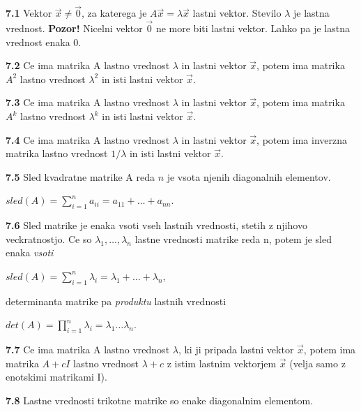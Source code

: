 \documentclass{article}
\begin{document}
\begin{multicols}{3}
\textbf{7.1} Vektor $\vec{x} \neq \vec{0}$, za katerega je $A\vec{x} = \lambda \vec{x}$ lastni vektor. Stevilo
$\lambda$ je lastna vrednost.
\textbf{Pozor!} Nicelni vektor $\vec{0}$ ne more biti lastni vektor. Lahko pa je lastna vrednost enaka 0.

\textbf{7.2} Ce ima matrika A lastno vrednost $\lambda$ in lastni vektor $\vec{x}$, potem ima matrika
$A^{2}$ lastno vrednost $\lambda^{2}$ in isti lastni vektor $\vec{x}$.

\textbf{7.3} Ce ima matrika A lastno vrednost $\lambda$ in lastni vektor $\vec{x}$, potem ima
matrika $A^{k}$ lastno vrednost $\lambda^{k}$ in isti lastni vektor $\vec{x}$.

\textbf{7.4} Ce ima matrika A lastno vrednost $\lambda$ in lastni vektor $\vec{x}$, potem ima
inverzna matrika lastno vrednost $1 / \lambda$ in isti lastni vektor $\vec{x}$.

\textbf{7.5} Sled kvadratne matrike A reda $n$ je vsota njenih diagonalnih elementov.
\begin{center}
    \begin{math}
        sled(A) =
        \sum_{i=1}^{n} a_{ii} =
        a_{11} + \dots + a_{nn}
    \end{math}.
\end{center}

\textbf{7.6} Sled matrike je enaka vsoti vseh lastnih vrednosti, stetih z njihovo veckratnostjo.
Ce so $\lambda_{1}, \dots, \lambda_{n}$ lastne vrednosti matrike reda n, potem je sled enaka \textit{vsoti}
\begin{center}
    \begin{math}
        sled(A) =
        \sum_{i=1}^{n} \lambda_{i} =
        \lambda_{1} + \dots + \lambda_{n}
    \end{math},
\end{center}
determinanta matrike pa \textit{produktu} lastnih vrednosti
\begin{center}
    \begin{math}
        det(A) =
        \prod_{i=1}^{n} \lambda_{i} =
        \lambda_{1} \dots  \lambda_{n}
    \end{math}.
\end{center}

\textbf{7.7} Ce ima matrika A lastno vrednost $\lambda$, ki ji pripada lastni vektor $\vec{x}$,
potem ima matrika $A + cI$ lastno vrednost $\lambda + c$ z istim lastnim vektorjem $\vec{x}$ (velja samo z
enotskimi matrikami I).

\textbf{7.8} Lastne vrednosti trikotne matrike so enake diagonalnim elementom.


\end{multicols}
\end{document}
